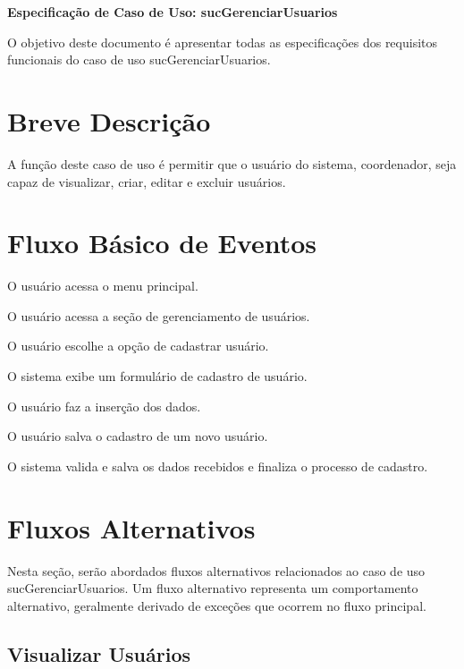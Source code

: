 \documentclass[12pt,a4paper]{article}
\newcommand{\ucnome}{sucGerenciarUsuarios}
\newcommand{\uctitulo}{Especificação de Caso de Uso: \ucnome}
\begin{document}

\begin{center}
  {\Large\bfseries \uctitulo}
\end{center}

\vspace{0.5\baselineskip}

O objetivo deste documento é apresentar todas as especificações dos requisitos
funcionais do caso de uso \ucnome.

\section{Breve Descrição}

A função deste caso de uso é permitir que o usuário do sistema, coordenador,
seja capaz de visualizar, criar, editar e excluir usuários.

\section{Fluxo Básico de Eventos}

\begin{fluxo}
  \item O usuário acessa o menu principal.
  \item O usuário acessa a seção de gerenciamento de usuários.
  \item O usuário escolhe a opção de cadastrar usuário.
  \item O sistema exibe um formulário de cadastro de usuário.
  \item O usuário faz a inserção dos dados.
  \item O usuário salva o cadastro de um novo usuário.
  \item O sistema valida e salva os dados recebidos e finaliza o processo de
        cadastro.
\end{fluxo}

\section{Fluxos Alternativos}

Nesta seção, serão abordados fluxos alternativos relacionados ao caso de uso
\ucnome. Um fluxo alternativo representa um comportamento alternativo,
geralmente derivado de exceções que ocorrem no fluxo principal.

\subsection{Visualizar Usuários}
\end{document}
